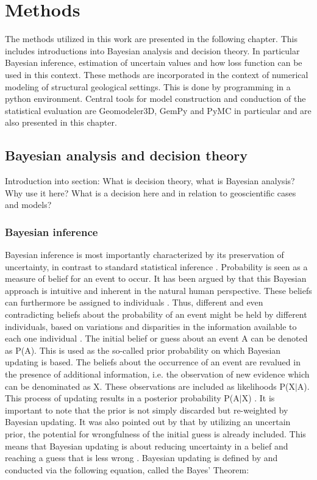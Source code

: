     \chapter{Methods}

    The methods utilized in this work are presented in the following chapter. This includes introductions into Bayesian analysis and decision theory. In particular Bayesian inference, estimation of uncertain values and how loss function can be used in this context. These methods are incorporated in the context of numerical modeling of structural geological settings. This is done by programming in a python environment. Central tools for model construction and conduction of the statistical evaluation are Geomodeler3D, GemPy and PyMC in particular and are also presented in this chapter.
    
        \section{Bayesian analysis and decision theory}
        Introduction into section: What is decision theory, what is Bayesian analysis? Why use it here?
        What is a decision here and in relation to geoscientific cases and models?
        
        \subsection{Bayesian inference}
        Bayesian inference is most importantly characterized by its preservation of uncertainty, in contrast to standard statistical inference \cite{davidson2015}. Probability is seen as a measure of belief for an event to occur. It has been argued by \cite{davidson2015}  that this Bayesian approach is intuitive and inherent in the natural human perspective. These beliefs can furthermore be assigned to individuals \cite{davidson2015}. Thus, different and even contradicting beliefs about the probability of an event might be held by different individuals, based on variations and disparities in the information available to each one individual \cite{davidson2015}.
        The initial belief or guess about an event A can be denoted as P(A). This is used as the so-called prior probability on which Bayesian updating is based. The beliefs about the occurrence of an event are revalued in the presence of additional information, i.e. the observation of new evidence which can be denominated as X. These observations are included as likelihoods P(X$|$A). This process of updating results in a posterior probability P(A$|$X) \cite{davidson2015}. It is important to note that the prior is not simply discarded but re-weighted by Bayesian updating. It was also pointed out by \cite{davidson2015} that by utilizing an uncertain prior, the potential for wrongfulness of the initial guess is already included. This means that Bayesian updating is about reducing uncertainty in a belief and reaching a guess that is less wrong \cite{davidson2015}.
        Bayesian updating is defined by and conducted via the following equation, called the Bayes' Theorem:
        
